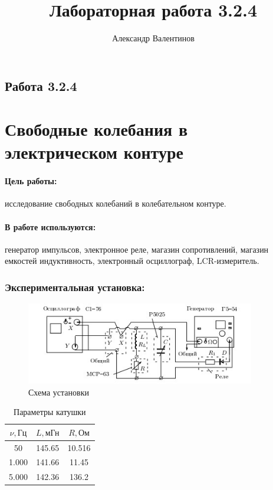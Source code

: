 \documentclass{article}
\author{Александр Валентинов}
\title{Лабораторная работа 3.2.4}
\begin{document}
   \subsection*{Работа 3.2.4}
   \section*{Свободные колебания в электрическом контуре}
   
   \paragraph{Цель работы:} исследование свободных колебаний в колебательном контуре.
   
   \paragraph{В работе используются:} генератор импульсов, электронное реле, магазин сопротивлений, магазин емкостей индуктивность, электронный осциллограф, LCR-измеритель.
   
   \subsubsection*{Экспериментальная установка:}
   
   \begin{figure}[h]
   \centering
   \includegraphics[width=10cm]{3_2_4.jpg} 
   \caption{Схема установки} 
   \label{fig.0} 
   \end{figure}
   
   \begin{table}[h]
   \centering 
   \caption{Параметры катушки}
   \begin{tabular}{|*{3}{c|}}
   \hline 
   $\nu, \text{Гц}$ & $L, \text{мГн}$ & $R, \text{Ом}$\\ \hline 
   50 & 145.65 & 10.516 \\ \hline 
   1.000 & 141.66 & 11.45 \\ \hline 
   5.000 & 142.36 & 136.2 \\ \hline 
   \end{tabular} 
   \end{table} 
   
\end{document}
